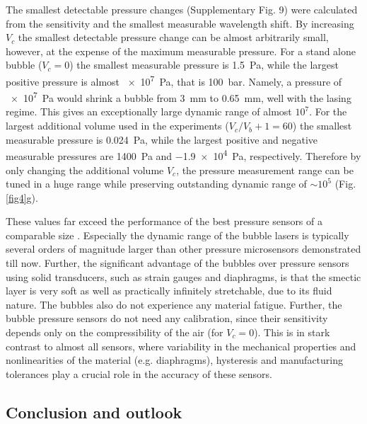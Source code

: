 \documentclass[a4paper,12pt]{article}
\begin{document}
	
	The smallest detectable pressure changes (Supplementary Fig. 9) were calculated from the sensitivity and the smallest measurable wavelength shift. By increasing $V_c$ the smallest detectable pressure change can be almost arbitrarily small, however, at the expense of the maximum measurable pressure.  For a stand alone bubble ($V_c=0$) the smallest measurable pressure is \SI{1.5}{Pa}, while the largest positive pressure is almost \SI{e7}{Pa}, that is \SI{100}{bar}. Namely, a pressure of \SI{e7}{Pa} would shrink a bubble from \SI{3}{mm} to \SI{0.65}{mm}, well with the lasing regime. This gives an exceptionally large dynamic range of almost $10^7$. For the largest additional volume used in the experiments ($V_c/V_b+1=60$) the smallest measurable pressure is \SI{0.024}{Pa}, while the largest positive and negative measurable pressures are \SI{1400}{Pa} and \SI{-1.9e4}{Pa}, respectively. Therefore by only changing the additional volume $V_c$, the pressure measurement range can be tuned in a huge range while preserving outstanding dynamic range of $\sim10^5$ (Fig. \ref{fig4}g).
	
	
	These values far exceed the performance of the best pressure sensors of a comparable size \cite{sahota2020fiber,vorathin2020review,domingues2018cost,zhu2013graphene,wang2016graphene,javed2019review,lin2018ultra,vsivskins2020sensitive,chen2019ultrahigh}. Especially the dynamic range of the bubble lasers is typically several orders of magnitude larger than other pressure microsensors demonstrated till now. Further, the significant advantage of the bubbles over pressure sensors using solid transducers, such as strain gauges and diaphragms, is that the smectic layer is very soft as well as practically infinitely stretchable, due to its fluid nature. The bubbles also do not experience any material fatigue. Further, the bubble pressure sensors do not need any calibration, since their sensitivity depends only on the compressibility of the air (for $V_c=0$). This is in stark contrast to almost all sensors, where variability in the mechanical properties and nonlinearities of the material (e.g. diaphragms), hysteresis and manufacturing tolerances play a crucial role in the accuracy of these sensors. 
	
	
	
	\subsection*{Conclusion and outlook}
	
\end{document}
